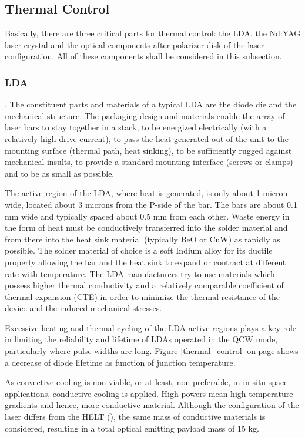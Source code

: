 \subsection{Thermal Control} 
\label{opticalthermal}
Basically, there are three critical parts for thermal control: the \acs{LDA}, the Nd:YAG \acs{laser} crystal and the optical components after polarizer disk of the \acs{laser} configuration. All of these components shall be considered in this subsection.

\subsubsection{\acs{LDA}}.
The constituent parts and materials of a typical \acs{LDA} are the diode die and the mechanical structure. The packaging design and materials enable the array of laser bars to stay together in a stack, to be energized electrically (with a relatively high drive current), to pass the heat generated out of the unit to the mounting surface (thermal path, heat sinking), to be sufficiently rugged against mechanical insults, to provide a standard mounting interface (screws or clamps) and to be as small as possible.

The active region of the \acs{LDA}, where heat is generated, is only about 1 micron wide, located about 3 microns from the P-side of the bar. The bars are about 0.1 mm wide and typically spaced about 0.5 mm from each other. Waste energy in the form of heat must be conductively transferred into the solder material and from there into the heat sink material (typically BeO or CuW) as rapidly as possible. The solder material of choice is a soft Indium alloy for its ductile property allowing the bar and the heat sink to expand or contract at different rate with temperature. The \acs{LDA} manufacturers try to use materials which possess higher thermal conductivity and a relatively comparable coefficient of thermal expansion (CTE) in order to minimize the thermal resistance of the device and the induced mechanical stresses.

Excessive heating and thermal cycling of the \acs{LDA} active regions plays a key role in limiting the reliability and lifetime of \acp{LDA} operated in the QCW mode, particularly where pulse widths are long. Figure \ref{thermal_control} on page \pageref{thermal_control} shows a decrease of diode lifetime as function of junction temperature.

As convective cooling is non-viable, or at least, non-preferable, in in-situ space applications, conductive cooling is applied. High powers mean high temperature gradients and hence, more conductive material. Although the configuration of the \acs{laser} differs from the HELT (\cite{nd_yag_life}), the same mass of conductive materials is considered, resulting in a total optical emitting payload mass of 15 kg. 

